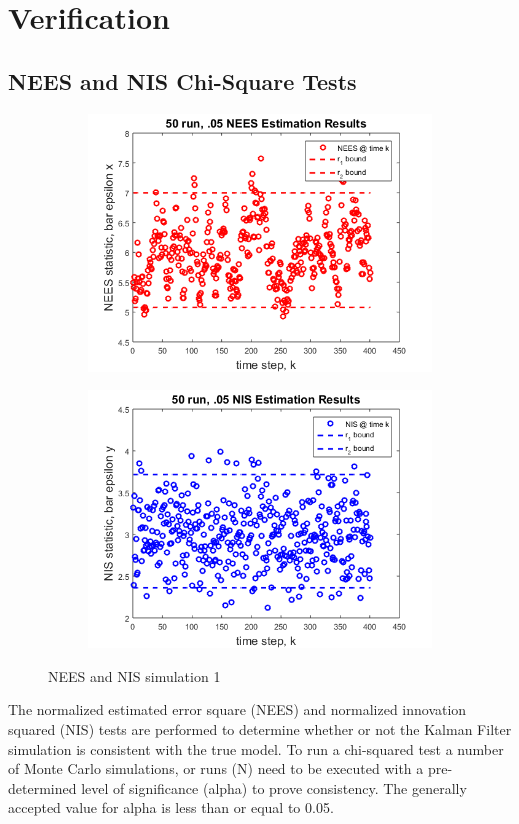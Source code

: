 \documentclass[12pt]{extarticle}
\begin{document}
\section{Verification}{

\subsection{NEES and NIS Chi-Square Tests}{
\begin{figure}[h!]
    \begin{subfigure}[b]{0.49\textwidth}
        \centering
        \includegraphics[width=\textwidth]{Images/50NEES.png}
    \end{subfigure}
    \begin{subfigure}[b]{0.49\textwidth}
        \centering
        \includegraphics[width=\textwidth]{Images/50NIS.png}
    \end{subfigure}
    \caption{NEES and NIS simulation 1}
    \label{nissim1}
\end{figure}
The normalized estimated error square (NEES) and normalized innovation squared (NIS) tests are performed to determine whether or not the Kalman Filter simulation is consistent with the true model.  To run a chi-squared test a number of Monte Carlo simulations, or runs (N) need to be executed with a pre-determined level of significance (alpha) to prove consistency.  The generally accepted value for alpha is less than or equal to 0.05.


}}
\end{document}
